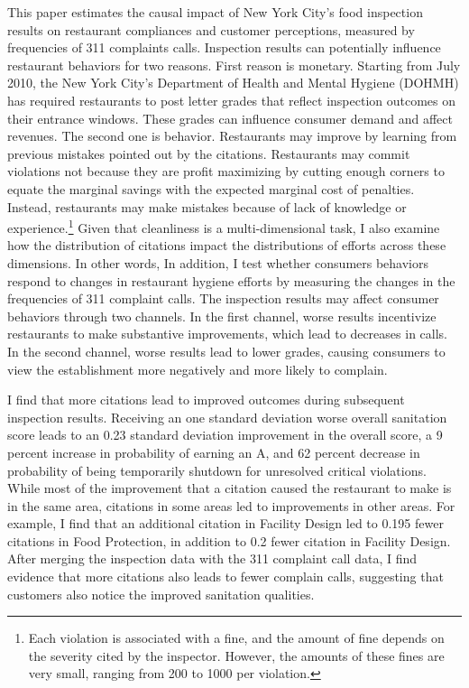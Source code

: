 \documentclass[12pt]{article}
\begin{document}
This paper estimates the causal impact of New York City's food inspection results on restaurant compliances and customer perceptions, measured by frequencies of 311 complaints calls. Inspection results can potentially influence restaurant behaviors for two reasons. First reason is monetary. Starting from July 2010, the  New York City's Department of Health and Mental Hygiene (DOHMH) has required restaurants to post letter grades that reflect inspection outcomes on their entrance windows. These grades can influence consumer demand and affect revenues. The second one is behavior. Restaurants may improve by learning from previous mistakes pointed out by the citations. Restaurants may commit violations not because they are profit maximizing by cutting enough corners to equate the marginal savings with the expected marginal cost of penalties. Instead, restaurants may make mistakes because of lack of knowledge or experience.\footnote{Each violation is associated with a fine, and the amount of fine depends on the severity cited by the inspector. However, the amounts of these fines are very small, ranging from 200 to 1000 per violation.} Given that cleanliness is a multi-dimensional task, I also examine how the distribution of citations impact the distributions of efforts across these dimensions. In other words, In addition, I test whether consumers behaviors respond to changes in restaurant hygiene efforts by measuring the changes in the frequencies of 311 complaint calls. The inspection results may affect consumer behaviors through two channels. In the first channel, worse results incentivize restaurants to make substantive improvements, which lead to decreases in calls. In the second channel, worse results lead to lower grades, causing consumers to view the establishment more negatively and more likely to complain. 

I find that more citations lead to improved outcomes during subsequent inspection results. Receiving an one standard deviation worse overall sanitation score leads to an 0.23 standard deviation improvement in the overall score, a 9 percent increase in probability of earning an A, and 62 percent decrease in probability of being temporarily shutdown for unresolved critical violations. While most of the improvement that a citation caused the restaurant to make is in the same area, citations in some areas led to improvements in other areas. For example, I find that an additional citation in Facility Design led to 0.195 fewer citations in Food Protection, in addition to 0.2 fewer citation in Facility Design. After merging the inspection data with the 311 complaint call data, I find evidence that more citations also leads to fewer complain calls, suggesting that customers also notice the improved sanitation qualities. 
\end{document}
